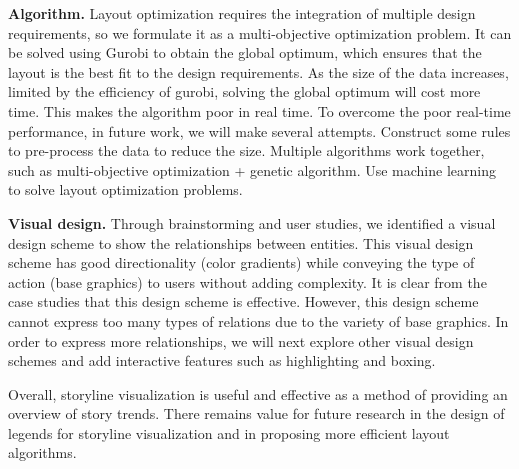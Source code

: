 \documentclass[review,journal]{vgtc}         %
\begin{document}
\textbf{Algorithm.} Layout optimization requires the integration of multiple design requirements, so we formulate it as a multi-objective optimization problem. It can be solved using Gurobi to obtain the global optimum, which ensures that the layout is the best fit to the design requirements. As the size of the data increases, limited by the efficiency of gurobi, solving the global optimum will cost more time. This makes the algorithm poor in real time. To overcome the poor real-time performance, in future work, we will make several attempts.  Construct some rules to pre-process the data to reduce the size.  Multiple algorithms work together, such as multi-objective optimization + genetic algorithm.  Use machine learning to solve layout optimization problems.

\textbf{Visual design.} Through brainstorming and user studies, we identified a visual design scheme to show the relationships between entities. This visual design scheme has good directionality (color gradients) while conveying the type of action (base graphics) to users without adding complexity. It is clear from the case studies that this design scheme is effective. However, this design scheme cannot express too many types of relations due to the variety of base graphics. In order to express more relationships, we will next explore other visual design schemes and add interactive features such as highlighting and boxing.

Overall, storyline visualization is useful and effective as a method of providing an overview of story trends. There remains value for future research in the design of legends for storyline visualization and in proposing more efficient layout algorithms.
\end{document}
